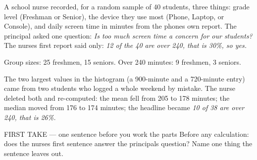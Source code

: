 \documentclass[12pt]{extarticle}
\begin{document}
\pagestyle{empty}


\noindent\begin{minipage}[t]{0.57\linewidth}
\vspace{0pt}
A school nurse recorded, for a random sample of 40 students, three things: grade level (Freshman or Senior), the device they use most (Phone, Laptop, or Console), and daily screen time in minutes from the phone\textquotesingle s own report. The principal asked one question: \emph{Is too much screen time a concern for our students?} The nurse\textquotesingle s first report said only: \emph{12 of the 40 are over 240, that is 30\%, so yes.}\par\smallskip Group sizes: 25 freshmen, 15 seniors. Over 240 minutes: 9 freshmen, 3 seniors.\par\smallskip The two largest values in the histogram (a 900-minute and a 720-minute entry) came from two students who logged a whole weekend by mistake. The nurse deleted both and re-computed: the mean fell from 205 to 178 minutes; the median moved from 176 to 174 minutes; the headline became \emph{10 of 38 are over 240, that is 26\%.}\par
\end{minipage}\hfill
\begin{minipage}[t]{0.40\linewidth}
\vspace{0pt}
\begin{center}
\end{center}
\end{minipage}

\begin{firsttakebox}{FIRST TAKE --- one sentence before you work the parts}
Before any calculation: does the nurse\textquotesingle s first sentence answer the principal\textquotesingle s question? Name one thing the sentence leaves out.
\end{firsttakebox}
\end{document}
